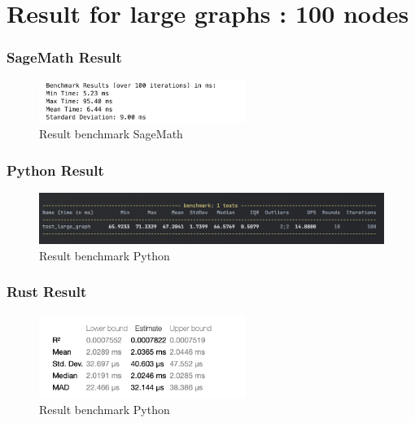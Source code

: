 \section{Result for large graphs : 100 nodes}\label{sec:result-for-large-graphs}

\subsubsection*{SageMath Result}
\begin{figure}[!h]
    \centering
    \includegraphics[width=0.60\textwidth]{images/benchmark/large_graph/benchmark_large_graph_sagemath}
    \caption{Result benchmark SageMath}
    \label{fig:benchmark-large-graph-sagemath}
\end{figure}

\subsubsection*{Python Result}
\begin{figure}[!h]
    \centering
    \includegraphics[width=1\textwidth]{images/benchmark/large_graph/benchmark_large_graph_python}
    \caption{Result benchmark Python}
    \label{fig:benchmark-large-graph-python}
\end{figure}

\subsubsection*{Rust Result}
\begin{figure}[!h]
    \centering
    \includegraphics[width=0.60\textwidth]{images/benchmark/large_graph/benchmark_large_graph_rust}
    \caption{Result benchmark Python}
    \label{fig:benchmark-large-graph-rust}
\end{figure}


